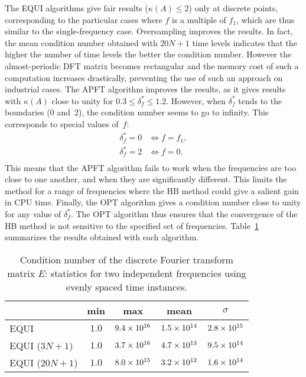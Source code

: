 The EQUI algorithms give fair results ($\kappa(A) \leq 2$) only at
discrete points, corresponding to the particular cases where $f$ is a
multiple of $f_1$, which are thus similar to the single-frequency
case. Oversampling improves the results. In fact, the mean condition number obtained
with $20N + 1$ time levels indicates that the higher the number of time levels
the better the condition number. However the almost-periodic DFT
matrix becomes rectangular and the memory cost of such a computation
increases drastically, preventing the use of such an approach on industrial cases. The APFT
algorithm improves the results, as it gives results with $\kappa ( A
)$ close to unity for $0.3 \leq \delta_f^* \leq 1.2$. However, when
$\delta_f^*$ tends to the boundaries (0 and~2), the condition
number seems to go to infinity. This corresponds to special values
of~$f$:
\begin{equation}
  \begin{split}
    \delta_f^* = 0 & \iff f = f_1, \\
    \delta_f^* = 2 & \iff f = 0. \\
  \end{split}
  \label{eq:singularities}
\end{equation}
This means that the APFT algorithm fails to work when the frequencies
are too close to one another, and when they are significantly
different.  This limits the method for a range of frequencies where
the HB method could give a salient gain in CPU time.
Finally, the OPT algorithm gives a condition number close to unity for
any value of $\delta_f^*$. The OPT algorithm thus ensures that the
convergence of the HB method is not sensitive to the specified set of
frequencies. Table~\ref{tab:algo_sum} summarizes the results obtained
with each algorithm.
\begin{table}[htb]
  \centering
  \begin{tabular}{lcccc}
    \toprule
    \phantom{abdefghijk} & min & max & mean & $\sigma$ \\
    \midrule
    EQUI & $1.0$ & $9.4\times 10^{16}$ & $1.5\times 10^{14}$ & $2.8\times 10^{15}$ \\
    EQUI ($3N + 1$) & $1.0$ & $3.7\times 10^{16}$ & $4.7\times 10^{13}$ & $9.5\times 10^{14}$ \\
    EQUI ($20N + 1$) & $1.0$ & $8.0\times 10^{15}$ & $3.2\times 10^{12}$ & $1.6\times 10^{14}$ \\
    \bottomrule
  \end{tabular}
  \caption{Condition number of the discrete Fourier transform matrix $E$: 
  statistics for two independent frequencies using evenly spaced time instances.}
  \label{tab:algo_sum}
\end{table} 

